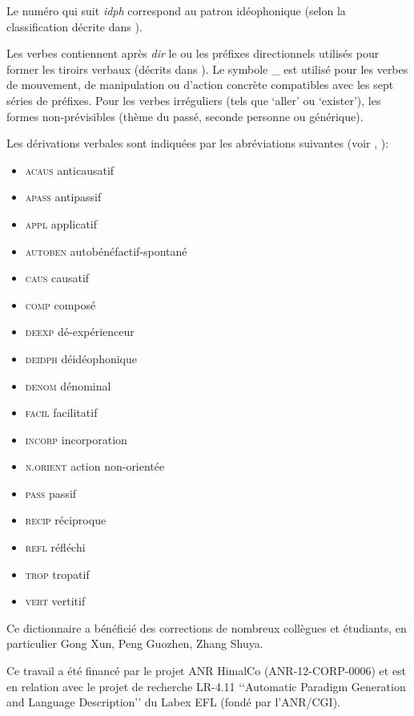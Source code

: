 Le numéro qui suit \textit{idph} correspond au patron idéophonique (selon la classification décrite dans \citealt{japhug14ideophones}).

Les verbes contiennent après \textit{dir} le ou les préfixes directionnels utilisés pour former les tiroirs verbaux (décrits dans \citealt[267-9]{jacques14linking}). Le symbole \_  est utilisé pour les verbes de mouvement, de manipulation ou d'action concrète compatibles avec les sept séries de préfixes. Pour les verbes irréguliers (tels que  `aller' ou   `exister'), les formes non-prévisibles (thème du passé, seconde personne ou générique). 

Les dérivations verbales sont indiquées par les abréviations suivantes (voir \citealt{jacques12incorp, jacques13tropative, jacques14antipassive,  jacques15spontaneous}, \citeyear{jacques15causative, jacques16relatives}):

\begin{itemize}
\item \textsc{acaus} anticausatif 
\item \textsc{apass} antipassif
\item \textsc{appl} applicatif
\item \textsc{autoben} autobénéfactif-spontané
\item \textsc{caus} causatif 
\item \textsc{comp} composé
\item \textsc{deexp} dé-expérienceur
\item \textsc{deidph} déidéophonique
\item \textsc{denom} dénominal
\item \textsc{facil} facilitatif
\item \textsc{incorp} incorporation
\item \textsc{n.orient} action non-orientée
\item \textsc{pass} passif
\item \textsc{recip} réciproque
\item \textsc{refl} réfléchi
\item \textsc{trop} tropatif
\item \textsc{vert} vertitif
\end{itemize}

Ce dictionnaire a bénéficié des corrections de nombreux collègues et étudiants, en particulier Gong Xun, Peng Guozhen, Zhang Shuya.

Ce travail a été financé par le projet ANR HimalCo  (ANR-12-CORP-0006) et est en relation avec le projet de recherche LR-4.11 ‘‘Automatic Paradigm Generation and Language Description’’ du Labex EFL (fondé par l'ANR/CGI).


